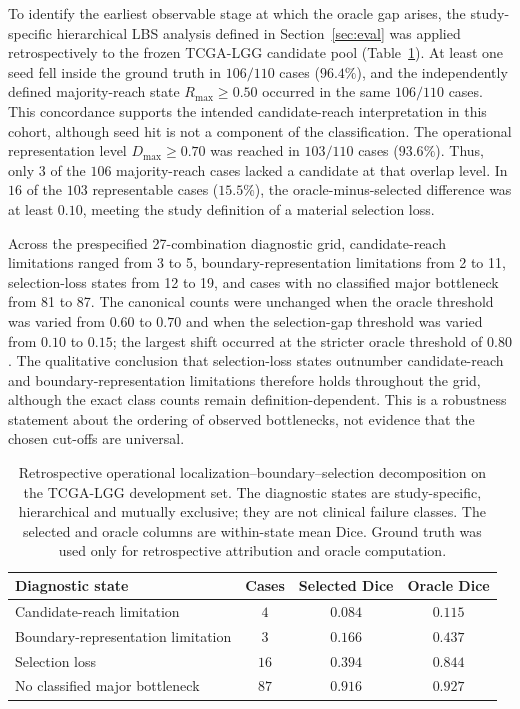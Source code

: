\documentclass[11pt,a4paper]{article}
\begin{document}
To identify the earliest observable stage at which the oracle gap arises, the
study-specific hierarchical LBS analysis defined in Section~\ref{sec:eval} was
applied retrospectively to the frozen TCGA-LGG candidate pool
(Table~\ref{tab:lbs}). At least one seed fell inside the ground truth in $106/110$
cases ($96.4\%$), and the independently defined majority-reach state
$R_{\max}\ge0.50$ occurred in the same $106/110$ cases. This concordance supports
the intended candidate-reach interpretation in this cohort, although seed hit is
not a component of the classification. The operational representation level
$D_{\max}\ge0.70$ was reached in $103/110$ cases ($93.6\%$). Thus, only $3$ of
the $106$ majority-reach cases lacked a candidate at that overlap level. In
$16$ of the $103$ representable cases ($15.5\%$), the oracle-minus-selected
difference was at least $0.10$, meeting the study definition of a material
selection loss.

Across the prespecified 27-combination diagnostic grid, candidate-reach
limitations ranged from 3 to 5, boundary-representation limitations from 2 to
11, selection-loss states from 12 to 19, and cases with no classified major
bottleneck from 81 to 87. The canonical counts
were unchanged when the oracle threshold was varied from $0.60$ to $0.70$ and when
the selection-gap threshold was varied from $0.10$ to $0.15$; the largest shift
occurred at the stricter oracle threshold of $0.80$. The qualitative conclusion
that selection-loss states outnumber candidate-reach and boundary-representation
limitations therefore holds throughout the grid, although the exact class counts
remain definition-dependent. This is a robustness statement about the ordering
of observed bottlenecks, not evidence that the chosen cut-offs are universal.

\begin{table}[h]\centering
\caption{Retrospective operational localization--boundary--selection
decomposition on the TCGA-LGG development set. The diagnostic states are
study-specific, hierarchical and mutually exclusive; they are not clinical
failure classes. The selected and oracle columns are within-state mean Dice.
Ground truth was used only for retrospective attribution and oracle computation.}
\label{tab:lbs}
\begin{tabular}{lccc}
\toprule
Diagnostic state & Cases & Selected Dice & Oracle Dice \\
\midrule
Candidate-reach limitation & $4$ & $0.084$ & $0.115$ \\
Boundary-representation limitation & $3$ & $0.166$ & $0.437$ \\
Selection loss & $16$ & $0.394$ & $0.844$ \\
No classified major bottleneck & $87$ & $0.916$ & $0.927$ \\
\bottomrule
\end{tabular}
\end{table}
\end{document}

